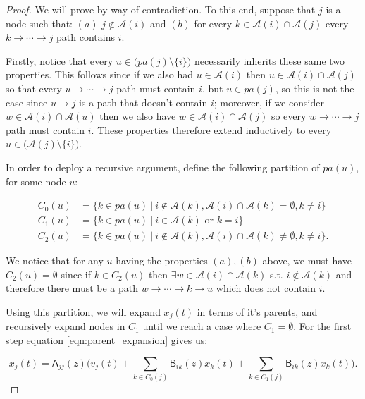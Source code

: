 \documentclass[12pt]{article}
\def\B{\mathsf{B}}  %
\def\A{\mathsf{A}}  %
\newcommand{\pa}[1]{pa(#1)}  %
\newcommand{\anc}[1]{\mathcal{A}(#1)}  %
\newcommand{\gcgpath}[2]{#1 \rightarrow \cdots \rightarrow #2}  %
\begin{document}
\begin{proof}
  We will prove by way of contradiction.  To this end, suppose that
  $j$ is a node such that: $(a)$ $j \not \in \anc{i}$ and $(b)$ for
  every $k \in \anc{i} \cap \anc{j}$ every
  $k \rightarrow \cdots \rightarrow j$ path contains $i$.

  Firstly, notice that every $u \in \big(\pa{j} \setminus \{i\}\big)$
  necessarily inherits these same two properties.  This follows since
  if we also had $u \in \anc{i}$ then $u \in \anc{i} \cap \anc{j}$ so that every
  $u \rightarrow \cdots \rightarrow j$ path must contain $i$, but
  $u \in \pa{j}$, so this is not the case since $u \rightarrow j$ is a
  path that doesn't contain $i$; moreover, if we consider
  $w \in \anc{i} \cap \anc{u}$ then we also have
  $w \in \anc{i} \cap \anc{j}$ so every
  $w \rightarrow \cdots \rightarrow j$ path must contain $i$.  These
  properties therefore extend inductively to every
  $u \in \big(\anc{j} \setminus \{i\}\big)$.

  In order to deploy a recursive argument, define the following
  partition of $\pa{u}$, for some node $u$:

  \begin{align*}
    C_0(u) &= \{k \in \pa{u}\ |\ i \not\in \anc{k}, \anc{i} \cap \anc{k} = \emptyset, k \ne i\}\\
    C_1(u) &= \{k \in \pa{u}\ |\ i \in \anc{k} \text{ or } k = i\}\\
    C_2(u) &= \{k \in \pa{u}\ |\ i \not\in \anc{k}, \anc{i} \cap \anc{k} \ne \emptyset, k \ne i\}.
  \end{align*}

  We notice that for any $u$ having the properties $(a), (b)$ above, we
  must have $C_2(u) = \emptyset$ since if $k \in C_2(u)$ then
  $\exists w \in \anc{i} \cap \anc{k}$ s.t. $i \not \in \anc{k}$ and
  therefore there must be a path $\gcgpath{w}{k} \rightarrow u$ which
  does not contain $i$.

  Using this partition, we will expand $x_j(t)$ in terms of it's
  parents, and recursively expand nodes in $C_1$ until we reach a case
  where $C_1 = \emptyset$.  For the first step equation
  \eqref{eqn:parent_expansion} gives us:

  \begin{equation}
    \label{eqn:xj_partition_expansion}
    x_j(t) = \A_{jj}(z)\Big(v_j(t) + \sum_{k \in C_0(j)}\B_{ik}(z)x_k(t) + \sum_{k \in C_1(j)}\B_{ik}(z)x_k(t)\Big).
  \end{equation}


\end{proof}
\end{document}
